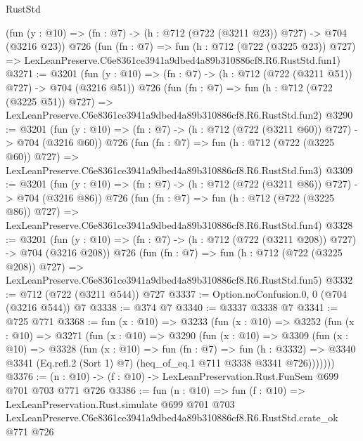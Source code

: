 \begin{lexlean}{RustStd}
\begin{coremodule}
    (fun (y : @10) => (fn : @7) -> (h : @712 (@722 (@3211 @23)) @727) -> @704 (@3216 @23))
    @726
    (fun (fn : @7) =>
    fun (h : @712 (@722 (@3225 @23)) @727) =>
    LexLeanPreserve.C6e8361ce3941a9dbed4a89b310886cf8.R6.RustStd.fun1)
@3271 := @3201
    (fun (y : @10) => (fn : @7) -> (h : @712 (@722 (@3211 @51)) @727) -> @704 (@3216 @51))
    @726
    (fun (fn : @7) =>
    fun (h : @712 (@722 (@3225 @51)) @727) =>
    LexLeanPreserve.C6e8361ce3941a9dbed4a89b310886cf8.R6.RustStd.fun2)
@3290 := @3201
    (fun (y : @10) => (fn : @7) -> (h : @712 (@722 (@3211 @60)) @727) -> @704 (@3216 @60))
    @726
    (fun (fn : @7) =>
    fun (h : @712 (@722 (@3225 @60)) @727) =>
    LexLeanPreserve.C6e8361ce3941a9dbed4a89b310886cf8.R6.RustStd.fun3)
@3309 := @3201
    (fun (y : @10) => (fn : @7) -> (h : @712 (@722 (@3211 @86)) @727) -> @704 (@3216 @86))
    @726
    (fun (fn : @7) =>
    fun (h : @712 (@722 (@3225 @86)) @727) =>
    LexLeanPreserve.C6e8361ce3941a9dbed4a89b310886cf8.R6.RustStd.fun4)
@3328 := @3201
    (fun (y : @10) => (fn : @7) -> (h : @712 (@722 (@3211 @208)) @727) -> @704 (@3216 @208))
    @726
    (fun (fn : @7) =>
    fun (h : @712 (@722 (@3225 @208)) @727) =>
    LexLeanPreserve.C6e8361ce3941a9dbed4a89b310886cf8.R6.RustStd.fun5)
@3332 := @712 (@722 (@3211 @544)) @727
@3337 := Option.noConfusion.{0, 0} (@704 (@3216 @544)) @7
@3338 := @374 @7
@3340 := @3337 @3338 @7
@3341 := @725 @771
@3368 := fun (x : @10) =>
  @3233
    (fun (x : @10) =>
    @3252
      (fun (x : @10) =>
      @3271
        (fun (x : @10) =>
        @3290
          (fun (x : @10) =>
          @3309
            (fun (x : @10) =>
            @3328
              (fun (x : @10) =>
              fun (fn : @7) =>
              fun (h : @3332) =>
              @3340 @3341 (Eq.refl.{2} (Sort 1) @7) (heq_of_eq.{1} @711 @3338 @3341 @726)))))))
@3376 := (n : @10) -> (f : @10) -> LexLeanPreservation.Rust.FunSem @699 @701 @703 @771 @726
@3386 := fun (n : @10) =>
  fun (f : @10) =>
  LexLeanPreservation.Rust.simulate
    @699
    @701
    @703
    LexLeanPreserve.C6e8361ce3941a9dbed4a89b310886cf8.R6.RustStd.crate_ok
    @771
    @726
\end{coremodule}
\end{lexlean}
